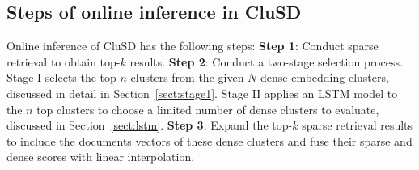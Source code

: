 \subsection{Steps of online inference in CluSD}
\label{sect:online}










Online inference of CluSD has the following steps:
\textbf{Step 1}:   Conduct sparse retrieval to obtain top-$k$ results.
\textbf{Step 2}:  Conduct a two-stage selection process. 
Stage I selects the top-$n$ clusters from  the given $N$ dense embedding clusters, discussed in detail in Section~\ref{sect:stage1}.
Stage II  applies an LSTM model to the $n$ top clusters
to choose  a limited number of dense clusters to evaluate, discussed in Section~\ref{sect:lstm}. 
\textbf{Step 3}: Expand the top-$k$ sparse retrieval results to include the documents vectors of these dense clusters and
fuse their sparse and dense scores with linear interpolation.  


